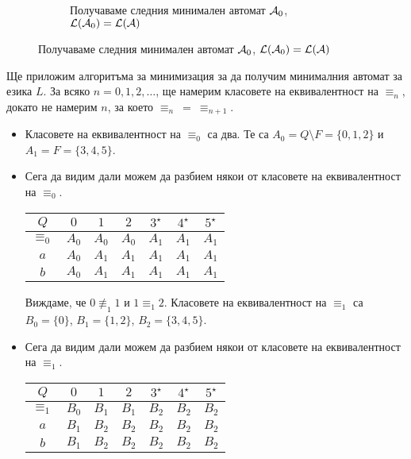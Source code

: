 \begin{example}
\begin{figure}[H]
\begin{subfigure}[b]{0.5\textwidth}
      \caption{Получаваме следния минимален автомат $\mathcal{A}_0$, $\mathcal{L}(\mathcal{A}_0) = \mathcal{L}(\mathcal{A})$}
      \label{sub:min1}
    \end{subfigure}
  \end{figure}

Ще приложим алгоритъма за минимизация за да получим минималния автомат за езика $L$.
За всяко $n = 0,1,2,\dots$, ще намерим класовете на еквивалентност на $\equiv_n$,
докато не намерим $n$, за което $\equiv_n\ =\ \equiv_{n+1}$.

\begin{itemize}
\item 
  Класовете на еквивалентност на $\equiv_0$ са два.
  Те са $A_0 = Q\setminus F = \{0,1,2\}$ и $A_1 = F = \{3,4,5\}$.
\item
  Сега да видим дали можем да разбием някои от класовете на еквивалентност на $\equiv_0$.
  
  \begin{tabular}{|c|c|c|c|c|c|c|}
    \hline
    $Q$ & $0$ & $1$ & $2$ & $3^\star$ & $4^\star$ & $5^\star$ \\
    \hline
    \hline
    $\equiv_0$ & $A_0$ & $A_0$ & $A_0$ & $A_1$ & $A_1$ & $A_1$\\
    \hline
    $a$ & $A_0$& $A_1$ & $A_1$ & $A_1$ & $A_1$ & $A_1$\\
    \hline
    $b$ & $A_0$& $A_1$ & $A_1$ & $A_1$ & $A_1$ & $A_1$\\
    \hline
  \end{tabular}

  Виждаме, че $0 \not\equiv_1 1$ и $1 \equiv_1 2$.
  Класовете на еквивалентност на $\equiv_1$ са 
  $B_0 = \{0\}$, $B_1 = \{1,2\}$, $B_2 = \{3,4,5\}$.
\item
  Сега да видим дали можем да разбием някои от класовете на еквивалентност на $\equiv_1$.
  
  \begin{tabular}{|c|c|c|c|c|c|c|}
    \hline
    $Q$ & $0$ & $1$ & $2$ & $3^\star$ & $4^\star$ & $5^\star$ \\
    \hline
    \hline
    $\equiv_1$ & $B_0$ & $B_1$ & $B_1$ & $B_2$ & $B_2$ & $B_2$\\
    \hline
    $a$ & $B_1$ & $B_2$ & $B_2$ & $B_2$ & $B_2$ & $B_2$\\
    \hline
    $b$ & $B_1$ & $B_2$ & $B_2$ & $B_2$ & $B_2$ & $B_2$\\
    \hline
  \end{tabular}


\end{itemize}
\end{example}

